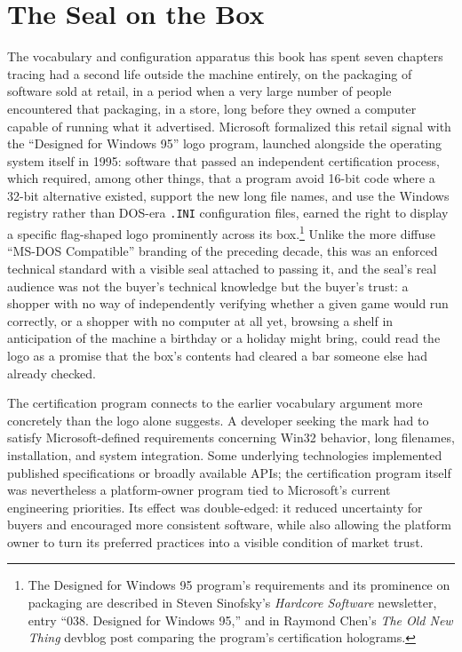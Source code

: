 \documentclass[11pt]{book}
\begin{document}
\section{The Seal on the Box}

The vocabulary and configuration apparatus this book has spent seven chapters tracing had a second life outside the machine entirely, on the packaging of software sold at retail, in a period when a very large number of people encountered that packaging, in a store, long before they owned a computer capable of running what it advertised. Microsoft formalized this retail signal with the \enquote{Designed for Windows 95} logo program, launched alongside the operating system itself in 1995: software that passed an independent certification process, which required, among other things, that a program avoid 16-bit code where a 32-bit alternative existed, support the new long file names, and use the Windows registry rather than DOS-era \texttt{.INI} configuration files, earned the right to display a specific flag-shaped logo prominently across its box.\footnote{The Designed for Windows 95 program's requirements and its prominence on packaging are described in Steven Sinofsky's \emph{Hardcore Software} newsletter, entry \enquote{038. Designed for Windows 95,} and in Raymond Chen's \emph{The Old New Thing} devblog post comparing the program's certification holograms.} Unlike the more diffuse \enquote{MS-DOS Compatible} branding of the preceding decade, this was an enforced technical standard with a visible seal attached to passing it, and the seal's real audience was not the buyer's technical knowledge but the buyer's trust: a shopper with no way of independently verifying whether a given game would run correctly, or a shopper with no computer at all yet, browsing a shelf in anticipation of the machine a birthday or a holiday might bring, could read the logo as a promise that the box's contents had cleared a bar someone else had already checked.

The certification program connects to the earlier vocabulary argument more concretely than the logo alone suggests. A developer seeking the mark had to satisfy Microsoft-defined requirements concerning Win32 behavior, long filenames, installation, and system integration. Some underlying technologies implemented published specifications or broadly available APIs; the certification program itself was nevertheless a platform-owner program tied to Microsoft's current engineering priorities. Its effect was double-edged: it reduced uncertainty for buyers and encouraged more consistent software, while also allowing the platform owner to turn its preferred practices into a visible condition of market trust.
\end{document}
